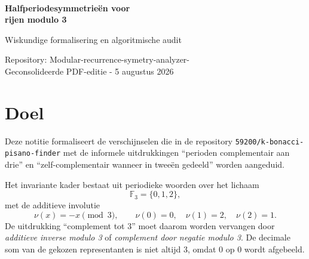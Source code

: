\documentclass[11pt,a4paper]{article}
\newcommand{\F}{\mathbb{F}}
\begin{document}
\sloppy
\thispagestyle{empty}
\vspace*{20mm}
\noindent{\color{AccentBlue}\rule{\textwidth}{0.8pt}}\\[22mm]
{\raggedright\fontsize{24}{29}\selectfont\bfseries\color{TitleBlue}Halfperiodesymmetrieën voor\\ rijen modulo 3\par}
\vspace{9mm}
{\fontsize{15}{20}\selectfont\color{AccentBlue}Wiskundige formalisering en algoritmische audit\par}
\vspace{17mm}
\noindent{}
\vfill
{\color{TitleBlue}\small
Repository: \textsf{Modular-recurrence-symetry-analyzer-}\\
Geconsolideerde PDF-editie - 5 augustus 2026
}\par
\vspace{18mm}
\noindent{\color{AccentBlue}\rule{\textwidth}{0.8pt}}
\clearpage
\setcounter{page}{1}

\tableofcontents
\clearpage

\section{Doel}
Deze notitie formaliseert de verschijnselen die in de repository \nolinkurl{59200/k-bonacci-pisano-finder} met de informele uitdrukkingen ``perioden complementair aan drie'' en ``zelf-complementair wanneer in tweeën gedeeld'' worden aangeduid.

Het invariante kader bestaat uit periodieke woorden over het lichaam
\[
\F_3=\{0,1,2\},
\]
met de additieve involutie
\[
\nu(x)=-x\pmod 3,\qquad \nu(0)=0,\quad \nu(1)=2,\quad \nu(2)=1.
\]
De uitdrukking ``complement tot 3'' moet daarom worden vervangen door \emph{additieve inverse modulo 3} of \emph{complement door negatie modulo 3}. De decimale som van de gekozen representanten is niet altijd 3, omdat 0 op 0 wordt afgebeeld.
\end{document}
